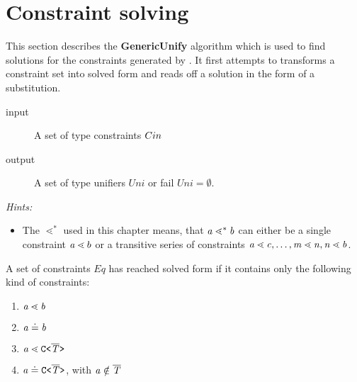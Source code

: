 \clearpage
\section{Constraint solving}
\label{sec:unify}

This section describes the \textbf{GenericUnify} algorithm
which is used to find solutions for the constraints generated by \fjtype.
It first attempts to transforms a constraint set into solved form and
reads off a solution in the form of a substitution.

  
\begin{description}
\item[input] A set of type constraints $C{in}$ %
\item[output] A set of type unifiers $Uni$
or fail $Uni = \emptyset$.
\end{description}

\textit{Hints:}
\begin{itemize}
\item The $\lessdot^*$ used in this chapter means,
that $\mathit{ a } \lessdot^* \mathit{ b }$ can either be a single constraint $\mathit{ a } \lessdot b$ or a transitive series of constraints
$\mathit{ a } \lessdot \mathit{ c }, \ldots, \mathit{ m } \lessdot \mathit{ n }, \mathit{ n } \lessdot \mathit{ b }$.
\end{itemize}
  
  \begin{definition}\label{def:solved-form}
    \textrm
    A set of constraints $Eq$ has reached solved form if it contains only the following kind of constraints:
    \begin{enumerate}
      \item $\mathit{ a } \lessdot \mathit{ b }$ %
      \item $\mathit{ a } \doteq \mathit{ b }$
      \item $\mathit{ a } \lessdot \mathtt{C \texttt{<} \overline{\tt \mathit{T}} \texttt{>} }$ %
      \item $\mathit{ a } \doteq \mathtt{C \texttt{<} \overline{\tt \mathit{T}} \texttt{>} }$, with $\mathit{ a } \notin \overline{\tt \mathit{T}}$
    \end{enumerate}
  \end{definition}  

